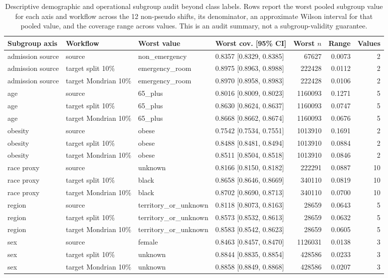 \begin{table}[!tbp]
\centering
\caption{Descriptive demographic and operational subgroup audit beyond class labels. Rows report the worst pooled subgroup value for each axis and workflow across the 12 non-pseudo shifts, its denominator, an approximate Wilson interval for that pooled value, and the coverage range across values. This is an audit summary, not a subgroup-validity guarantee.}
\label{tab:demographic_subgroup_audit}
\scriptsize
\setlength{\tabcolsep}{2.5pt}
\renewcommand{\arraystretch}{1.08}
\begin{tabularx}{\textwidth}{@{}L{2.0cm}L{2.35cm}L{2.8cm}L{2.7cm}rrr@{}}
\toprule
Subgroup axis & Workflow & Worst value & Worst cov. [95\% CI] & Worst $n$ & Range & Values \\
\midrule
admission source & source & non\_emergency & 0.8357 [0.8329, 0.8385] & 67627 & 0.0073 & 2 \\
admission source & target split 10\% & emergency\_room & 0.8975 [0.8963, 0.8988] & 222428 & 0.0112 & 2 \\
admission source & target Mondrian 10\% & emergency\_room & 0.8970 [0.8958, 0.8983] & 222428 & 0.0106 & 2 \\
age & source & 65\_plus & 0.8016 [0.8009, 0.8023] & 1160093 & 0.1271 & 5 \\
age & target split 10\% & 65\_plus & 0.8630 [0.8624, 0.8637] & 1160093 & 0.0747 & 5 \\
age & target Mondrian 10\% & 65\_plus & 0.8668 [0.8662, 0.8674] & 1160093 & 0.0676 & 5 \\
obesity & source & obese & 0.7542 [0.7534, 0.7551] & 1013910 & 0.1691 & 2 \\
obesity & target split 10\% & obese & 0.8488 [0.8481, 0.8494] & 1013910 & 0.0884 & 2 \\
obesity & target Mondrian 10\% & obese & 0.8511 [0.8504, 0.8518] & 1013910 & 0.0846 & 2 \\
race proxy & source & unknown & 0.8166 [0.8150, 0.8182] & 222291 & 0.0887 & 10 \\
race proxy & target split 10\% & black & 0.8658 [0.8646, 0.8669] & 340110 & 0.0819 & 10 \\
race proxy & target Mondrian 10\% & black & 0.8702 [0.8690, 0.8713] & 340110 & 0.0700 & 10 \\
region & source & territory\_or\_unknown & 0.8118 [0.8073, 0.8163] & 28659 & 0.0643 & 5 \\
region & target split 10\% & territory\_or\_unknown & 0.8573 [0.8532, 0.8613] & 28659 & 0.0632 & 5 \\
region & target Mondrian 10\% & territory\_or\_unknown & 0.8583 [0.8542, 0.8623] & 28659 & 0.0605 & 5 \\
sex & source & female & 0.8463 [0.8457, 0.8470] & 1126031 & 0.0138 & 3 \\
sex & target split 10\% & unknown & 0.8844 [0.8835, 0.8854] & 428586 & 0.0233 & 3 \\
sex & target Mondrian 10\% & unknown & 0.8858 [0.8849, 0.8868] & 428586 & 0.0207 & 3 \\
\bottomrule
\end{tabularx}
\end{table}
